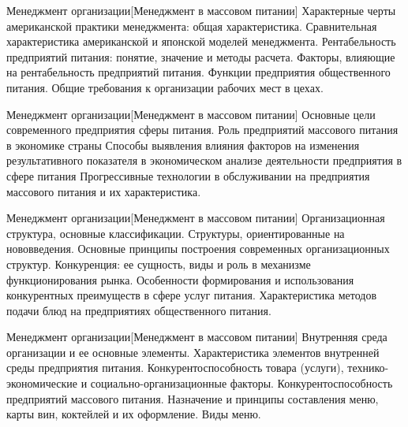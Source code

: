 \documentclass[
	11pt,
	a4paper,
	]
	{article}
\begin{document}
\begin{minipage}[t][\miniH]{\miniL}\centering
	 {Менеджмент организации}[Менеджмент в массовом питании]
		{
			Характерные черты американской практики менеджмента: общая характеристика. Сравнительная характеристика американской и японской моделей менеджмента.
		}{
			Рентабельность предприятий питания: понятие, значение и методы расчета. Факторы, влияющие на рентабельность предприятий питания.
		}{
			Функции предприятия общественного питания. Общие требования к организации рабочих мест в цехах.
		}
	\lowGE
\end{minipage}

\vfill



\begin{minipage}[t][\miniH]{\miniL}\centering
	 {Менеджмент организации}[Менеджмент в массовом питании]
		{
			Основные цели современного предприятия сферы питания. Роль предприятий массового питания в экономике страны
		}{
			Способы выявления влияния факторов на изменения результативного показателя в экономическом анализе деятельности предприятия в сфере питания
		}{
			Прогрессивные технологии в обслуживании на предприятия массового питания и их характеристика.
		}
	\lowGE
\end{minipage}

\vfill



\begin{minipage}[t][\miniH]{\miniL}\centering
	 {Менеджмент организации}[Менеджмент в массовом питании]
		{
			Организационная структура, основные классификации. Структуры, ориентированные на нововведения. Основные принципы построения современных организационных структур.
		}{
			Конкуренция: ее сущность, виды и роль в механизме функционирования рынка. Особенности формирования и использования конкурентных преимуществ в сфере услуг питания.
		}{
			Характеристика методов подачи блюд на предприятиях общественного питания.
		}
	\lowGE
\end{minipage}





\begin{minipage}[t][\miniH]{\miniL}\centering
	 {Менеджмент организации}[Менеджмент в массовом питании]
		{
			Внутренняя среда организации и ее основные элементы. Характеристика элементов внутренней среды предприятия питания.
		}{
			Конкурентоспособность товара (услуги), технико-экономические и социально-организационные факторы. Конкурентоспособность предприятий массового питания.
		}{
			Назначение и принципы составления меню, карты вин, коктейлей и их оформление. Виды меню.
		}
	\lowGE
\end{minipage}
\end{document}
